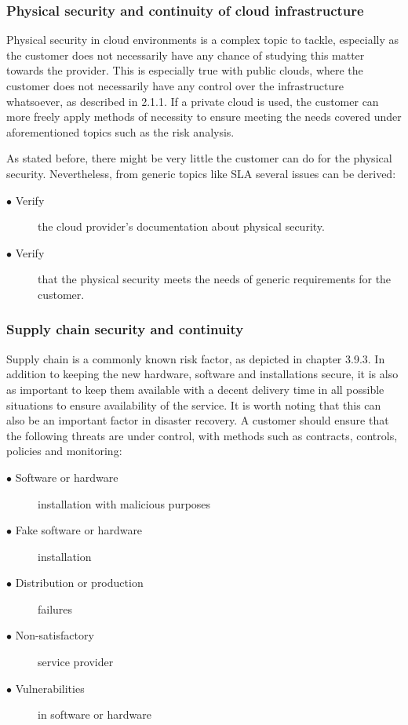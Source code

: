\documentclass{article}
\begin{document}
\subsubsection{Physical security and continuity of cloud infrastructure}
Physical security in cloud environments is a complex topic to tackle, especially as the customer does not necessarily have any chance of studying this matter towards the provider. This is especially true with public clouds, where the customer does not necessarily have any control over the infrastructure whatsoever, as described in 2.1.1. If a private cloud is used, the customer can more freely apply methods of necessity to ensure meeting the needs covered under aforementioned topics such as the risk analysis.
\par
As stated before, there might be very little the customer can do for the physical security. Nevertheless, from generic topics like SLA several issues can be derived:
\begin{description}
	\item[$\bullet$ Verify] the cloud provider's documentation about physical security.
	\item[$\bullet$ Verify] that the physical security meets the needs of generic requirements for the customer.
\end{description}	
 
\subsubsection{Supply chain security and continuity}
Supply chain is a commonly known risk factor, as depicted in chapter 3.9.3. In addition to keeping the new hardware, software and installations secure, it is also as important to keep them available with a decent delivery time in all possible situations to ensure availability of the service. It is worth noting that this can also be an important factor in disaster recovery. A customer should ensure that the following threats are under control, with methods such as contracts, controls, policies and monitoring:
\begin{description}
	\item[$\bullet$ Software or hardware] installation with malicious purposes 
	\item[$\bullet$ Fake software or hardware] installation
	\item[$\bullet$ Distribution or production] failures
	\item[$\bullet$ Non-satisfactory] service provider
	\item[$\bullet$ Vulnerabilities] in software or hardware
\end{description}
\end{document}
